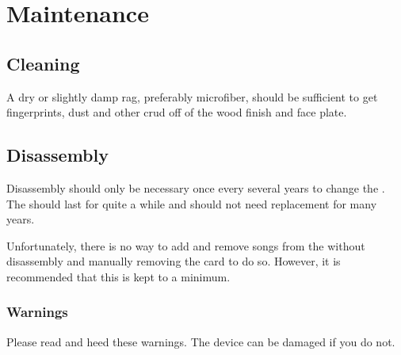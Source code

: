 \part{Maintenance} \label{Maintenance}

\chapter{Cleaning} \label{Cleaning}

A dry or slightly damp rag, preferably microfiber, should be sufficient to get
fingerprints, dust and other crud off of the wood finish and \front{} face
plate.


\chapter{Disassembly} \label{Disassembly}

Disassembly should only be necessary once every several years to change the
.  The  should last for quite a while and should not need
replacement for many years.

\par\medskip

Unfortunately, there is no way to add and remove songs from the  without
disassembly and manually removing the card to do so.  However, it is recommended
that this is kept to a minimum.

\section{Warnings}

Please read and heed these warnings.  The device can be damaged if you do not.

